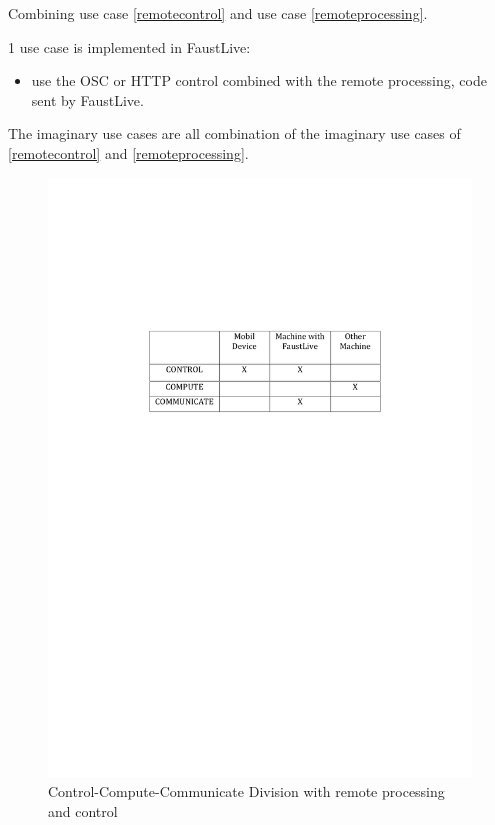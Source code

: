 \documentclass[a4paper]{article}
\begin{document}
Combining use case {\ref{remotecontrol}} and use case {\ref{remoteprocessing}}.

1 use case is implemented in FaustLive:
\begin{itemize}
\item use the OSC or HTTP control combined with the remote processing, code sent by FaustLive.
\end{itemize}

The imaginary use cases are all combination of the imaginary use cases of {\ref{remotecontrol}} and {\ref{remoteprocessing}}.

\begin{figure}[!h]
\begin{center}
\includegraphics[width=0.7\columnwidth]{images/5CCC}
\caption{Control-Compute-Communicate Division with remote processing and control}
\label{fig:5CCC}
\end{center}
\end{figure}
\end{document}
